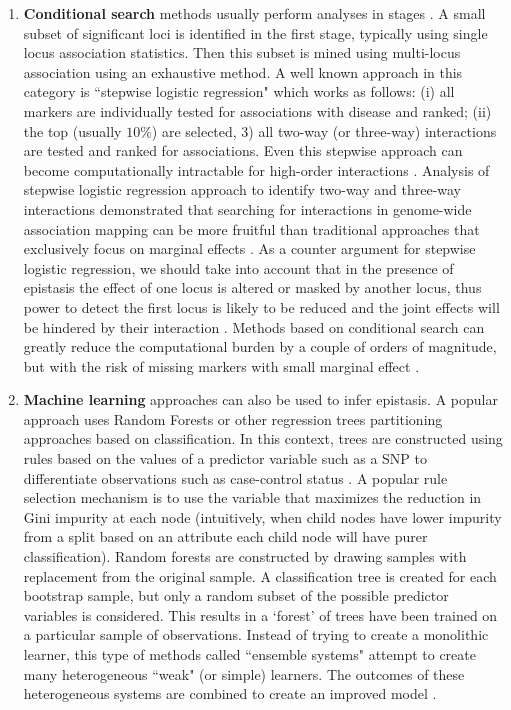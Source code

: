 \begin{enumerate}
	\item \textbf{Conditional search} methods usually perform analyses in stages \cite{li2011detecting}.
A small subset of significant loci is identified in the first stage, typically using single locus association statistics.
Then this subset is mined using multi-locus association using an exhaustive method. 
A well known approach in this category is ``stepwise logistic regression" which works as follows: (i) all markers are individually tested for associations with disease and ranked; (ii) the top (usually $10\%$) are selected, 3) all two-way (or three-way) interactions are tested and ranked for associations. 
Even this stepwise approach can become computationally intractable for high-order interactions \cite{zhang2007bayesian}.
Analysis of stepwise logistic regression approach to identify two-way and three-way interactions demonstrated that searching for interactions in genome-wide association mapping can be more fruitful than traditional approaches that exclusively focus on marginal effects \cite{zhang2007bayesian}.
As a counter argument for stepwise logistic regression, we should take into account that in the presence of epistasis the effect of one locus is altered or masked by another locus, thus power to detect the first locus is likely to be reduced and the joint effects will be hindered by their interaction \cite{cordell2002epistasis}. 
Methods based on conditional search can greatly reduce the computational burden by a couple of orders of magnitude, but with the risk of missing markers with small marginal effect \cite{li2011detecting}.

	\item \textbf{Machine learning} approaches can also be used to infer epistasis.
A popular approach uses Random Forests \cite{li2011detecting} or other regression trees partitioning approaches based on classification.
In this context, trees are constructed using rules based on the values of a predictor variable such as a SNP to differentiate observations such as case-control status \cite{cordell2009detecting}.
A popular rule selection mechanism is to use the variable that maximizes the reduction in Gini impurity \cite{REF} at each node (intuitively, when child nodes have lower impurity from a split based on an attribute each child node will have purer classification).
Random forests are constructed by drawing samples with replacement from the original sample. 
A classification tree is created for each bootstrap sample, but only a random subset of the possible predictor variables is considered. 
This results in a `forest' of trees have been trained on a particular sample of observations. \cite{cordell2009detecting}
Instead of trying to create a monolithic learner, this type of methods called ``ensemble systems" attempt to create many heterogeneous ``weak" (or simple) learners. 
The outcomes of these heterogeneous systems are combined to create an improved model \cite{li2011detecting}.


\end{enumerate}
